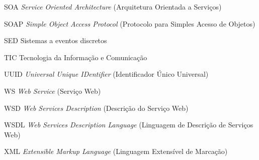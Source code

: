 \begin{siglas}
	\item[SOA] \textit{Service Oriented Architecture} (Arquitetura Orientada a Serviços)
	\item[SOAP] \textit{Simple Object Access Protocol} (Protocolo para Simples Acesso de Objetos)
	\item[SED] Sistemas a eventos discretos
	\item[TIC] Tecnologia da Informação e Comunicação
	\item[UUID] \textit{Universal Unique IDentifier} (Identificador Único Universal)
	\item[WS] \textit{Web Service} (Serviço Web)
	\item[WSD] \textit{Web Services Description} (Descrição do Serviço Web)
	\item[WSDL] \textit{Web Services Description Language} (Linguagem de Descrição de Serviços Web)
	\item[XML] \textit{Extensible Markup Language} (Linguagem Extensível de Marcação)
\end{siglas}

\tableofcontents*
\cleardoublepage
